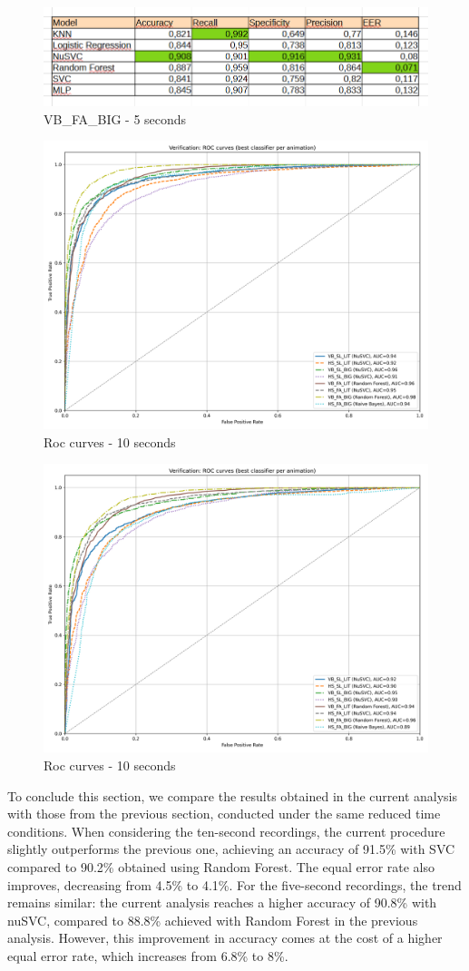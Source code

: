 \documentclass{article}
\begin{document}
\begin{figure}[ht]
    \centering
    \includegraphics[width = 0.8
    \textwidth]{Images/Results/Classic_procedure/five_ten/st/five/VB_FA_BIG.png}
    \caption{VB\_FA\_BIG - 5 seconds}
    \label{fig:VB_FA_BIG_cst_5}
\end{figure}

\begin{figure}[ht]
    \centering
    \includegraphics[width = 0.6
    \textwidth]{Images/Results/Classic_procedure/five_ten/st/ten/Verification_single_roc_classic_ten_st.png}
    \caption{Roc curves - 10 seconds}
    \label{fig:roc_cst_10}
\end{figure}

\begin{figure}[ht]
    \centering
    \includegraphics[width = 0.6
    \textwidth]{Images/Results/Classic_procedure/five_ten/st/five/Verification_single_roc_classic_five_st.png}
    \caption{Roc curves - 10 seconds}
    \label{fig:roc_cst_5}
\end{figure}

To conclude this section, we compare the results obtained in the current analysis with those from the previous section, conducted under the same reduced time conditions.
When considering the ten-second recordings, the current procedure slightly outperforms the previous one, achieving an accuracy of 91.5\% with SVC compared to 90.2\% obtained using Random Forest. 
The equal error rate also improves, decreasing from 4.5\% to 4.1\%.
For the five-second recordings, the trend remains similar: the current analysis reaches a higher accuracy of 90.8\% with nuSVC, compared to 88.8\% achieved with Random Forest in the previous analysis. 
However, this improvement in accuracy comes at the cost of a higher equal error rate, which increases from 6.8\% to 8\%.
\end{document}
